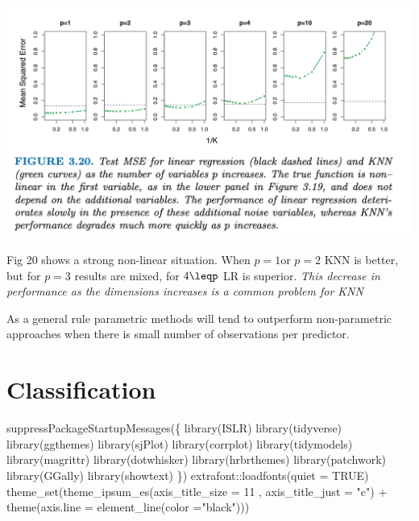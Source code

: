 \documentclass[
  letterpaper,
  DIV=11,
  numbers=noendperiod]{scrreprt}
\newenvironment{Shaded}{\begin{snugshade}}{\end{snugshade}}
\newcommand{\AttributeTok}[1]{\textcolor[rgb]{0.65,0.35,0.00}{#1}}
\newcommand{\ConstantTok}[1]{\textcolor[rgb]{0.85,0.12,0.09}{#1}}
\newcommand{\DecValTok}[1]{\textcolor[rgb]{0.47,0.16,0.63}{#1}}
\newcommand{\FunctionTok}[1]{\textcolor[rgb]{0.02,0.16,0.49}{#1}}
\newcommand{\NormalTok}[1]{\textcolor[rgb]{0.33,0.33,0.33}{#1}}
\newcommand{\SpecialCharTok}[1]{\textcolor[rgb]{0.00,0.46,0.62}{#1}}
\newcommand{\StringTok}[1]{\textcolor[rgb]{0.00,0.50,0.00}{#1}}
\begin{document}
\includegraphics{fig3.20.png}

Fig 20 shows a strong non-linear situation. When \(p=1\)or \(p=2\) KNN
is better, but for \(p=3\) results are mixed, for \(4\leqp\) LR is
superior. \emph{This decrease in performance as the dimensions increases
is a common problem for KNN}

As a general rule parametric methods will tend to outperform
non-parametric approaches when there is small number of observations per
predictor.


\hypertarget{classification}{%
\chapter{Classification}\label{classification}}

\begin{Shaded}
\begin{Highlighting}[]
\FunctionTok{suppressPackageStartupMessages}\NormalTok{(\{}
\FunctionTok{library}\NormalTok{(ISLR)}
\FunctionTok{library}\NormalTok{(tidyverse)}
\FunctionTok{library}\NormalTok{(ggthemes)}
\FunctionTok{library}\NormalTok{(sjPlot)}
\FunctionTok{library}\NormalTok{(corrplot)}
\FunctionTok{library}\NormalTok{(tidymodels)}
\FunctionTok{library}\NormalTok{(magrittr)}
\FunctionTok{library}\NormalTok{(dotwhisker)}
\FunctionTok{library}\NormalTok{(hrbrthemes)}
\FunctionTok{library}\NormalTok{(patchwork)}
\FunctionTok{library}\NormalTok{(GGally)}
\FunctionTok{library}\NormalTok{(showtext)}
\NormalTok{\})}
\NormalTok{extrafont}\SpecialCharTok{::}\FunctionTok{loadfonts}\NormalTok{(}\AttributeTok{quiet =} \ConstantTok{TRUE}\NormalTok{)}
\FunctionTok{theme\_set}\NormalTok{(}\FunctionTok{theme\_ipsum\_es}\NormalTok{(}\AttributeTok{axis\_title\_size =} \DecValTok{11}\NormalTok{ , }\AttributeTok{axis\_title\_just =} \StringTok{"c"}\NormalTok{) }\SpecialCharTok{+} \FunctionTok{theme}\NormalTok{(}\AttributeTok{axis.line =} \FunctionTok{element\_line}\NormalTok{(}\AttributeTok{color =}\StringTok{"black"}\NormalTok{)))}
\end{Highlighting}
\end{Shaded}
\end{document}
